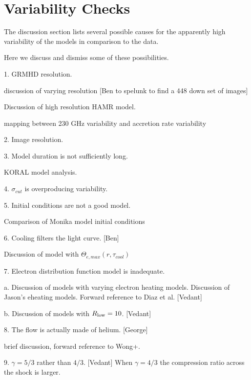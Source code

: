\section{Variability Checks}\label{app:variability}


The discussion section lists several possible causes for the apparently high variability of the models in comparison to the data.

Here we discuss and dismiss some of these possibilities.

1. GRMHD resolution.

discussion of varying resolution [Ben to spelunk to find a 448 down set of images]

Discussion of high resolution HAMR model.

mapping between 230 GHz variability and accretion rate variability

2. Image resolution.

3. Model duration is not sufficiently long.

KORAL model analysis.

4. $\sigma_{cut}$ is overproducing variability.

5. Initial conditions are not a good model.

Comparison of Monika model initial conditions

6. Cooling filters the light curve. [Ben]

Discussion of model with $\Theta_{e,max}(r, \tau_{cool})$

7. Electron distribution function model is inadequate.

a.  Discussion of models with varying electron heating models.  Discussion of Jason's eheating models.   Forward reference to Diaz et al.  [Vedant]

b. Discussion of models with $R_\mathrm{low} = 10$. [Vedant]

8. The flow is actually made of helium. [George]

brief discussion, forward reference to Wong+.

9. $\gamma = 5/3$ rather than $4/3$.   [Vedant]  When $\gamma = 4/3$ the compression ratio across the shock is larger.
